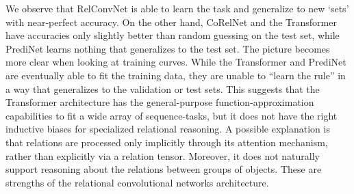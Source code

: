 We observe that RelConvNet is able to learn the task and generalize to new `sets' with near-perfect accuracy. On the other hand, CoRelNet and the Transformer have accuracies only slightly better than random guessing on the test set, while PrediNet learns nothing that generalizes to the test set. The picture becomes more clear when looking at training curves. While the Transformer and PrediNet are eventually able to fit the training data, they are unable to ``learn the rule'' in a way that generalizes to the validation or test sets. This suggests that the Transformer architecture has the general-purpose function-approximation capabilities to fit a wide array of sequence-tasks, but it does not have the right inductive biases for specialized relational reasoning. A possible explanation is that relations are processed only implicitly through its attention mechanism, rather than explicitly via a relation tensor. Moreover, it does not naturally support reasoning about the relations between groups of objects. These are strengths of the relational convolutional networks architecture.